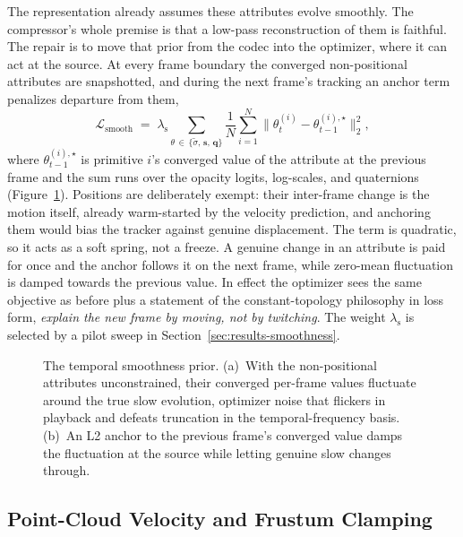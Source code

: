 The representation already assumes these attributes evolve smoothly. The compressor's
whole premise is that a low-pass reconstruction of them is faithful. The repair is to
move that prior from the codec into the optimizer, where it can act at the source. At
every frame boundary the converged non-positional attributes are snapshotted, and
during the next frame's tracking an anchor term penalizes departure from them,
\begin{equation}
    \mathcal{L}_{\text{smooth}} \;=\; \lambda_{\text{s}} \!\!\sum_{\theta \,\in\, \{\tilde\sigma,\, \mathbf{s},\, \mathbf{q}\}}\!\!
    \frac{1}{N}\sum_{i=1}^{N} \big\| \theta^{(i)}_t - \theta^{(i),\star}_{t-1} \big\|_2^2 ,
    \label{eq:smooth}
\end{equation}
where $\theta^{(i),\star}_{t-1}$ is primitive $i$'s converged value of the attribute at
the previous frame and the sum runs over the opacity logits, log-scales, and
quaternions (Figure~\ref{fig:smoothness-tikz}). Positions are deliberately exempt:
their inter-frame change is the motion itself, already warm-started by the velocity
prediction, and anchoring them would bias the tracker against genuine displacement.
The term is quadratic, so it acts as a soft spring, not a freeze. A genuine change in
an attribute is paid for once and the anchor follows it on the next frame, while
zero-mean fluctuation is damped towards the previous value. In effect the optimizer
sees the same objective as before plus a statement of the constant-topology
philosophy in loss form, \emph{explain the new frame by moving, not by twitching}.
The weight $\lambda_{\text{s}}$ is selected by a pilot sweep in
Section~\ref{sec:results-smoothness}.

\begin{figure}[!ht]
    \centering
    \resizebox{0.9\linewidth}{!}{}
    \caption{The temporal smoothness prior. (a)~With the non-positional attributes
    unconstrained, their converged per-frame values fluctuate around the true slow
    evolution, optimizer noise that flickers in playback and defeats truncation in
    the temporal-frequency basis. (b)~An L2 anchor to the previous frame's converged
    value damps the fluctuation at the source while letting genuine slow changes
    through.}
    \label{fig:smoothness-tikz}
\end{figure}

\subsection{Point-Cloud Velocity and Frustum Clamping}
\label{sec:velocity}

